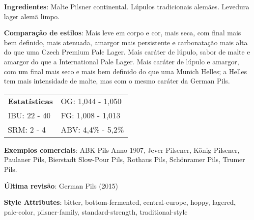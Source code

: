 \textbf{Ingredientes}: Malte Pilsner continental. Lúpulos tradicionais alemães. Levedura lager alemã limpo.

\textbf{Comparação de estilos}: Mais leve em corpo e cor, mais seca, com final mais bem definido, mais atenuada, amargor mais persistente e carbonatação mais alta do que uma Czech Premium Pale Lager. Mais caráter de lúpulo, sabor de malte e amargor do que a International Pale Lager. Mais caráter de lúpulo e amargor, com um final mais seco e mais bem definido do que uma Munich Helles; a Helles tem mais intensidade de malte, mas com o mesmo caráter da German Pils.

\begin{tabular}{@{}p{35mm}p{35mm}@{}}
  \textbf{Estatísticas} & OG: 1,044 - 1,050 \\
  IBU: 22 - 40  & FG: 1,008 - 1,013  \\
  SRM: 2 - 4  & ABV: 4,4\% - 5,2\%
\end{tabular}

\textbf{Exemplos comerciais}: ABK Pils Anno 1907, Jever Pilsener, König Pilsener, Paulaner Pils, Bierstadt Slow-Pour Pils, Rothaus Pils, Schönramer Pils, Trumer Pils.

\textbf{Última revisão}: German Pils (2015)

\textbf{Style Attributes}: bitter, bottom-fermented, central-europe, hoppy, lagered, pale-color, pilsner-family, standard-strength, traditional-style

